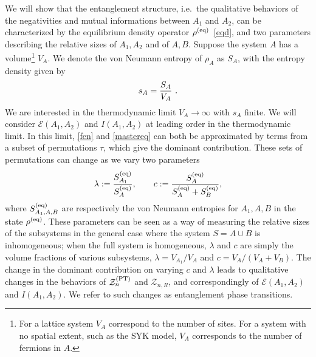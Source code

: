 \documentclass[a4paper,11pt]{article}
\newcommand{\be}{\begin{equation}}
\newcommand{\ee}{\end{equation}}
\newcommand\lam{\lambda}
\newcommand\ov{\over}
\newcommand\sE{{\ensuremath{{\mathcal E}}}}
\newcommand\sZ{{\mathcal Z}}
\begin{document}
We will show that the entanglement structure, i.e.~the qualitative behaviors of the negativities and mutual informations between $A_1$ and $A_2$, can be characterized by the equilibrium density operator $\rho^{(\rm eq)}$~\eqref{eqd}, and two parameters describing the relative sizes of $A_1, A_2$ and of $A, B$. Suppose the system $A$ has a volume\footnote{For a lattice system $V_A$ correspond to the number of sites. For a system with no spatial extent, such as the SYK model, $V_A$ corresponds to the number of fermions in $A$.} 
$V_A$. We denote the von Neumann entropy of $\rho_A$ as $S_A$, with the entropy density given by 
\be 
s_A = {S_A \ov V_A} \ . %
\ee
We are interested in the thermodynamic limit $V_A\to \infty$ with $s_A$ finite. 
We will consider $\sE(A_1, A_2)$ and $I(A_1,A_2)$ at leading order in the thermodynamic limit. In this limit, \eqref{fen} and \eqref{mastereq} can both be approximated by terms from a subset of permutations $\tau$, which give the dominant contribution. These sets of permutations can change as we vary two parameters
\be \label{cde1}
\lam := {S_{A_1}^{(\rm eq)} \ov S_A^{(\rm eq)}} , \qquad c := {S_A^{(\rm eq)} \ov S_A^{(\rm eq)} + S_B^{(\rm eq)}},
\ee
where $S_{A_1, A, B}^{\rm (eq)}$ are respectively the von Neumann entropies for $A_1, A, B$ in the state $\rho^{(\rm eq)}$. These parameters can be seen as a way of measuring the relative sizes of the subsystems in the general case where the system $S = A \cup B$ is inhomogeneous; when the full system is homogeneous, $\lam$ and $c$ 
are simply the volume fractions of various subsystems, $\lam = {V_{A_1}/ V_A}$ and $c = {V_A /( V_A + V_B)}$. The change in the dominant contribution on varying $c$ and $\lambda$ leads to qualitative changes in the behaviors of $\sZ_n^{\rm (PT)}$ and $\sZ_{n, R}$, and correspondingly of $\sE(A_1, A_2)$ and $I(A_1,A_2)$. We refer to such changes as entanglement phase transitions.




 



\end{document}
